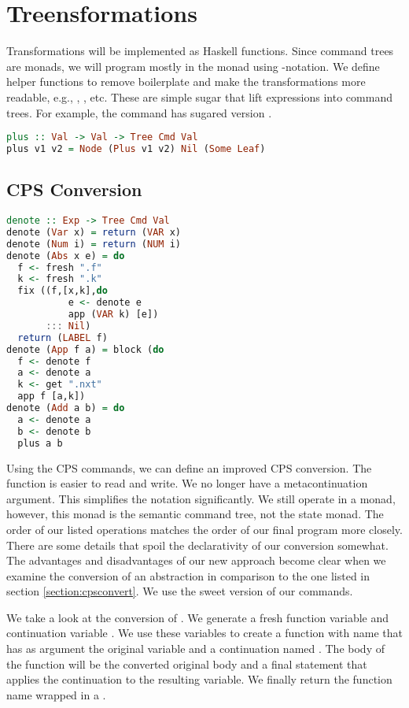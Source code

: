 \section{\label{section:treensforms}Treensformations}
Transformations will be implemented as Haskell functions. Since command trees are monads, we will program mostly in the monad using -notation. We define helper functions to remove boilerplate and make the transformations more readable, e.g., , , etc. These are simple sugar that lift expressions into command trees. For example, the  command has sugared version .

\begin{lstlisting}[language=Haskell]
plus :: Val -> Val -> Tree Cmd Val
plus v1 v2 = Node (Plus v1 v2) Nil (Some Leaf)
\end{lstlisting}

\subsection{\label{subsection:cpsconvert2}CPS Conversion}
\begin{lstlisting}[language=Haskell]
denote :: Exp -> Tree Cmd Val
denote (Var x) = return (VAR x)
denote (Num i) = return (NUM i)
denote (Abs x e) = do
  f <- fresh ".f"
  k <- fresh ".k"
  fix ((f,[x,k],do
           e <- denote e
           app (VAR k) [e])
       ::: Nil)
  return (LABEL f)
denote (App f a) = block (do
  f <- denote f
  a <- denote a
  k <- get ".nxt"
  app f [a,k])
denote (Add a b) = do
  a <- denote a
  b <- denote b
  plus a b
\end{lstlisting}

Using the \ac{CPS} commands, we can define an improved \ac{CPS} conversion. The function is easier to read and write. We no longer have a metacontinuation argument. This simplifies the notation significantly. We still operate in a monad, however, this monad is the semantic command tree, not the state monad. The order of our listed operations matches the order of our final program more closely. There are some details that spoil the declarativity of our conversion somewhat. The advantages and disadvantages of our new approach become clear when we examine the conversion of an abstraction in comparison to the one listed in section \ref{section:cpsconvert}. We use the sweet version of our commands.

We take a look at the conversion of . We generate a fresh function variable  and continuation variable . We use these variables to create a function with name  that has as argument the original variable and a continuation named . The body of the function will be the converted original body and a final statement that applies the continuation to the resulting variable. We finally return the function name wrapped in a .


